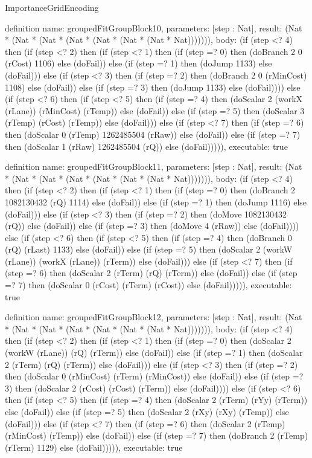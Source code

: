 \begin{lexlean}{ImportanceGridEncoding}
\begin{semanticmodule}
definition{
  name: groupedFitGroupBlock10,
  parameters: [step : Nat],
  result: (Nat * (Nat * (Nat * (Nat * (Nat * (Nat * (Nat * Nat))))))),
  body: (if (step <? 4) then
      (if (step <? 2) then
      (if (step <? 1) then
      (if (step =? 0) then (doBranch 2 0 (rCost) 1106) else (doFail)) else
      (if (step =? 1) then (doJump 1133) else (doFail))) else
      (if (step <? 3) then
      (if (step =? 2) then (doBranch 2 0 (rMinCost) 1108) else (doFail)) else
      (if (step =? 3) then (doJump 1133) else (doFail)))) else
      (if (step <? 6) then
      (if (step <? 5) then
      (if (step =? 4) then (doScalar 2 (workX (rLane)) (rMinCost) (rTemp)) else (doFail)) else
      (if (step =? 5) then (doScalar 3 (rTemp) (rCost) (rTemp)) else (doFail))) else
      (if (step <? 7) then
      (if (step =? 6) then (doScalar 0 (rTemp) 1262485504 (rRaw)) else (doFail)) else
      (if (step =? 7) then (doScalar 1 (rRaw) 1262485504 (rQ)) else (doFail))))),
  executable: true
}

definition{
  name: groupedFitGroupBlock11,
  parameters: [step : Nat],
  result: (Nat * (Nat * (Nat * (Nat * (Nat * (Nat * (Nat * Nat))))))),
  body: (if (step <? 4) then
      (if (step <? 2) then
      (if (step <? 1) then
      (if (step =? 0) then (doBranch 2 1082130432 (rQ) 1114) else (doFail)) else
      (if (step =? 1) then (doJump 1116) else (doFail))) else
      (if (step <? 3) then
      (if (step =? 2) then (doMove 1082130432 (rQ)) else (doFail)) else
      (if (step =? 3) then (doMove 4 (rRaw)) else (doFail)))) else
      (if (step <? 6) then
      (if (step <? 5) then
      (if (step =? 4) then (doBranch 0 (rQ) (rLast) 1133) else (doFail)) else
      (if (step =? 5) then (doScalar 2 (workW (rLane)) (workX (rLane)) (rTerm)) else (doFail))) else
      (if (step <? 7) then
      (if (step =? 6) then (doScalar 2 (rTerm) (rQ) (rTerm)) else (doFail)) else
      (if (step =? 7) then (doScalar 0 (rCost) (rTerm) (rCost)) else (doFail))))),
  executable: true
}

definition{
  name: groupedFitGroupBlock12,
  parameters: [step : Nat],
  result: (Nat * (Nat * (Nat * (Nat * (Nat * (Nat * (Nat * Nat))))))),
  body: (if (step <? 4) then
      (if (step <? 2) then
      (if (step <? 1) then
      (if (step =? 0) then (doScalar 2 (workW (rLane)) (rQ) (rTerm)) else (doFail)) else
      (if (step =? 1) then (doScalar 2 (rTerm) (rQ) (rTerm)) else (doFail))) else
      (if (step <? 3) then
      (if (step =? 2) then (doScalar 0 (rMinCost) (rTerm) (rMinCost)) else (doFail)) else
      (if (step =? 3) then (doScalar 2 (rCost) (rCost) (rTerm)) else (doFail)))) else
      (if (step <? 6) then
      (if (step <? 5) then
      (if (step =? 4) then (doScalar 2 (rTerm) (rYy) (rTerm)) else (doFail)) else
      (if (step =? 5) then (doScalar 2 (rXy) (rXy) (rTemp)) else (doFail))) else
      (if (step <? 7) then
      (if (step =? 6) then (doScalar 2 (rTemp) (rMinCost) (rTemp)) else (doFail)) else
      (if (step =? 7) then (doBranch 2 (rTemp) (rTerm) 1129) else (doFail))))),
  executable: true
}


\end{semanticmodule}
\end{lexlean}
